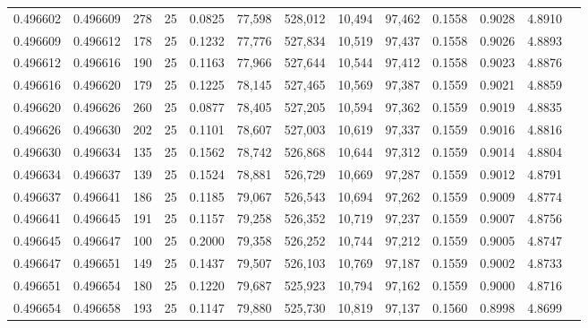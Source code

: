 \begin{tabular}{rrrrrrrrrrrrr}
0.496602 & 0.496609 & 278 &  25 &                                     0.0825 &  77,598 & 528,012 &  10,494 &  97,462 & 0.1558 & 0.9028 & 4.8910 \\
0.496609 & 0.496612 & 178 &  25 &                                     0.1232 &  77,776 & 527,834 &  10,519 &  97,437 & 0.1558 & 0.9026 & 4.8893 \\
0.496612 & 0.496616 & 190 &  25 &                                     0.1163 &  77,966 & 527,644 &  10,544 &  97,412 & 0.1558 & 0.9023 & 4.8876 \\
0.496616 & 0.496620 & 179 &  25 &                                     0.1225 &  78,145 & 527,465 &  10,569 &  97,387 & 0.1559 & 0.9021 & 4.8859 \\
0.496620 & 0.496626 & 260 &  25 &                                     0.0877 &  78,405 & 527,205 &  10,594 &  97,362 & 0.1559 & 0.9019 & 4.8835 \\
0.496626 & 0.496630 & 202 &  25 &                                     0.1101 &  78,607 & 527,003 &  10,619 &  97,337 & 0.1559 & 0.9016 & 4.8816 \\
0.496630 & 0.496634 & 135 &  25 &                                     0.1562 &  78,742 & 526,868 &  10,644 &  97,312 & 0.1559 & 0.9014 & 4.8804 \\
0.496634 & 0.496637 & 139 &  25 &                                     0.1524 &  78,881 & 526,729 &  10,669 &  97,287 & 0.1559 & 0.9012 & 4.8791 \\
0.496637 & 0.496641 & 186 &  25 &                                     0.1185 &  79,067 & 526,543 &  10,694 &  97,262 & 0.1559 & 0.9009 & 4.8774 \\
0.496641 & 0.496645 & 191 &  25 &                                     0.1157 &  79,258 & 526,352 &  10,719 &  97,237 & 0.1559 & 0.9007 & 4.8756 \\
0.496645 & 0.496647 & 100 &  25 &                                     0.2000 &  79,358 & 526,252 &  10,744 &  97,212 & 0.1559 & 0.9005 & 4.8747 \\
0.496647 & 0.496651 & 149 &  25 &                                     0.1437 &  79,507 & 526,103 &  10,769 &  97,187 & 0.1559 & 0.9002 & 4.8733 \\
0.496651 & 0.496654 & 180 &  25 &                                     0.1220 &  79,687 & 525,923 &  10,794 &  97,162 & 0.1559 & 0.9000 & 4.8716 \\
0.496654 & 0.496658 & 193 &  25 &                                     0.1147 &  79,880 & 525,730 &  10,819 &  97,137 & 0.1560 & 0.8998 & 4.8699 \\

\end{tabular}
